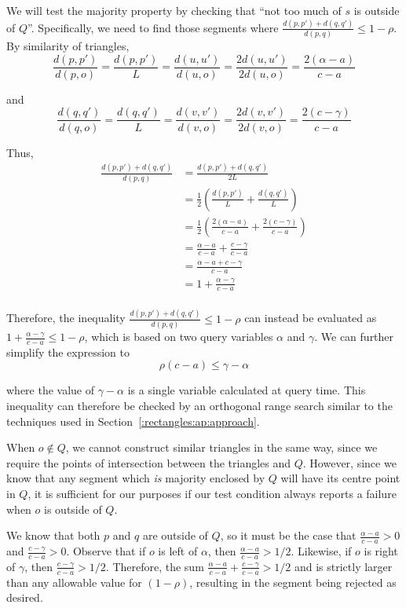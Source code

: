 We will test the majority property by checking that ``not too much of $s$ is outside of $Q$''. Specifically, we need to find those segments where $\frac{d(p, p') + d(q, q')}{d(p, q)} \leq 1 - \rho$. By similarity of triangles, 
\[ 
\frac{d(p, p')}{d(p, o)} = \frac{d(p, p')}{L} = \frac{d(u, u')}{d(u, o)} = \frac{2 d(u, u')}{2 d(u, o)} = \frac{2(\alpha - a)}{c - a}
\]

\noindent and 
\[ 
\frac{d(q, q')}{d(q, o)} = \frac{d(q, q')}{L} = \frac{d(v, v')}{d(v, o)} = \frac{2 d(v, v')}{2 d(v, o)} = \frac{2(c - \gamma)}{c - a}
\]

\noindent Thus,
\[
\begin{split} 
\frac{d(p, p') + d(q, q')}{d(p, q)}
%
&= \frac{d(p, p') + d(q, q')}{2L} \\
%
&= \frac{1}{2} \left ( \frac{d(p, p')}{L} + \frac{d(q, q')}{L} \right ) \\
%
&= \frac{1}{2} \left ( \frac{2(\alpha - a)}{c - a} + \frac{2(c - \gamma)}{c - a} \right ) \\
%
&= \frac{\alpha - a}{c - a} + \frac{c - \gamma}{c - a} \\
%
&= \frac{\alpha - a + c - \gamma}{c - a} \\
%
&= 1 + \frac{\alpha - \gamma}{c - a} \\
%
\end{split}
\]

Therefore, the inequality $\frac{d(p, p') + d(q, q')}{d(p, q)} \leq 1 - \rho$ can instead be evaluated as $1 + \frac{\alpha - \gamma}{c - a} \leq 1 - \rho$, which is based on two query variables $\alpha$ and $\gamma$.  We can further simplify the expression to
\[ 
\rho(c - a) \leq \gamma - \alpha
\]

\noindent where the value of $\gamma - \alpha$ is a single variable calculated at query time.  This inequality can therefore be checked by an orthogonal range search similar to the techniques used in Section~\ref{:rectangles:ap:approach}.

When $o \not \in Q$, we cannot construct similar triangles in the same way, since we require the points of intersection between the triangles and $Q$.  However, since we know that any segment which \emph{is} majority enclosed by $Q$ will have its centre point in $Q$, it is sufficient for our purposes if our test condition always reports a failure when $o$ is outside of $Q$.

We know that both $p$ and $q$ are outside of $Q$, so it must be the case that $\frac{\alpha - a}{c - a} > 0$ and $\frac{c - \gamma}{c - a} > 0$. Observe that if $o$ is left of $\alpha$, then $\frac{\alpha - a}{c - a} > 1/2$. Likewise, if $o$ is right of $\gamma$, then $\frac{c - \gamma}{c - a} > 1/2$. Therefore, the sum $\frac{\alpha - a}{c - a} + \frac{c - \gamma}{c - a} > 1/2$ and is strictly larger than any allowable value for $(1 - \rho)$, resulting in the segment being rejected as desired.


